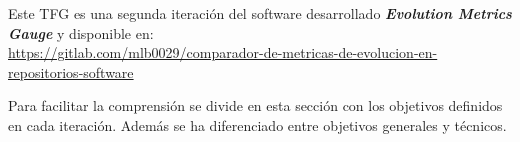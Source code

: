 

Este TFG es una segunda iteración del software desarrollado \textit{\textbf{Evolution Metrics Gauge}} y disponible en: 
\\ \url{https://gitlab.com/mlb0029/comparador-de-metricas-de-evolucion-en-repositorios-software}
  
Para facilitar la comprensión se divide en esta sección con los objetivos definidos en cada iteración. Además se ha diferenciado entre objetivos generales y técnicos.

